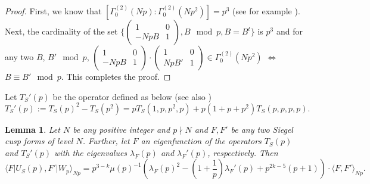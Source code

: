 \documentclass[11pt]{amsart}
\numberwithin{equation}{section}
\theoremstyle{plain}
\newtheorem{lem}[thm]{Lemma}
\theoremstyle{definition}
\newcommand{\lan}{\langle }
\newcommand{\ran}{\rangle}
\newcommand{\smat}[4]{\left( \begin{smallmatrix}#1&#2\\#3&#4\end{smallmatrix}\right)}
\begin{document}
\begin{proof}
   First, we know that $[\Gamma_0^{(2)}(Np):\Gamma_0^{(2)}(Np^2)]=p^3$ (see for example \cite{klingen1959bemerkung}). Next, the cardinality of the set $\{ \smat{1}{0}{-NpB}{1}, B\mod p, B=B^t\}$ is $p^3$ and for any two $B$, $B' \mod p$,  $\smat{1}{0}{-NpB}{1}\cdot \smat{1}{0}{NpB'}{1}\in \Gamma_0^{(2)}(Np^2)$ $\iff$ $B\equiv B' \mod p$. This completes the proof.
\end{proof}
Let $T_S'(p)$ be the operator defined as below (see also \cite[pp. 158]{Ibu-SK})
\begin{equation} \label{t'p}
    T_S'(p):=T_S(p)^2-T_S(p^2)=pT_S(1,p,p^2,p)+p(1+p+p^2)T_S(p,p,p,p).
\end{equation}

\begin{lem}\label{L1Uswp}
    Let $N$ be any positive integer and $p\nmid N$ and $F,F'$ be any two Siegel cusp forms of level $N$. Further, let $F$ an eigenfunction of the operators $T_S(p)$ and $T_S'(p)$ with the eigenvalues $\lambda_F(p)$ and $\lambda_F'(p)$, respectively. Then   
    \begin{equation}
        \displaystyle \lan F|U_S(p), F'|W_p \ran_{Np} =p^{3-k}\mu(p)^{-1}\left(\lambda_F(p)^2- (1+\frac{1}{p})\lambda_F'(p) +p^{2k-5}(p+1) \right) \cdot \lan F,F' \ran_{Np}.
    \end{equation}
 \end{lem}   
\end{document}

